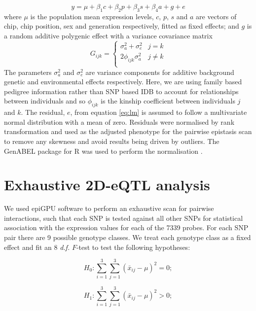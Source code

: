 \documentclass{article}
\begin{document}
\begin{equation}
y = \mu + \beta_{1}c + \beta_{2}p + \beta_{3}s + \beta_{4}a + g + e
\label{eq:lm}
\end{equation}
where $\mu$ is the population mean expression levels, $c$, $p$, $s$ and $a$ are vectors of chip, chip position, sex and generation respectively, fitted as fixed effects; and $g$ is a random additive polygenic effect with a variance covariance matrix 
\begin{equation}
G_{ijk} = \left \{ 
\begin{array}{ll}
\sigma _a ^2 + \sigma _e ^2&        j = k \\ 
2\phi _{ijk} \sigma _a ^2& 			j \neq k \\
\end{array} \right.
\end{equation}
The parameters $\sigma_a^2$ and $\sigma_e^2$ are variance components for additive background genetic and environmental effects respectively. Here, we are using family based pedigree information rather than SNP based IDB to account for relationships between individuals and so $\phi _{ijk}$ is the kinship coefficient between individuals $j$ and $k$. The residual, $e$, from equation \ref{eq:lm} is assumed to follow a multivariate normal distribution with a mean of zero. Residuals were normalised by rank transformation and used as the adjusted phenotype for the pairwise epistasis scan to remove any skewness and avoid results being driven by outliers. The GenABEL package for R was used to perform the normalisation \cite{Aulchenko2007}.


\section{Exhaustive 2D-eQTL analysis}

We used epiGPU \cite{Hemani2011} software to perform an exhaustive scan for pairwise interactions, such that each SNP is tested against all other SNPs for statistical association with the expression values for each of the 7339 probes. For each SNP pair there are 9 possible genotype classes. We treat each genotype class as a fixed effect and fit an 8 \emph{d.f.} $F$-test to test the following hypotheses:

\begin{equation}
H _0 : \sum _{i=1} ^3 \sum _{j=1} ^3 (\bar x _{ij} - \mu) ^2 = 0; 
\end{equation}

\begin{equation}
H _1 : \sum _{i=1} ^3 \sum _{j=1} ^3 (\bar x _{ij} - \mu) ^2 > 0; 
\label{eq:8df}
\end{equation}
\end{document}
